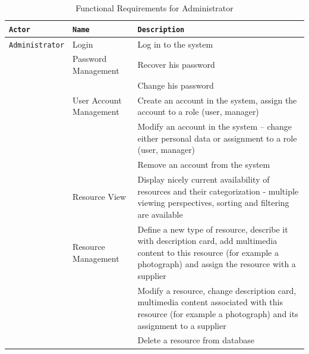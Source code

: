 \documentclass[a4paper,11pt,twoside]{report}
\theoremstyle{definition}
\begin{document}
\begin{longtable}{|p{3cm}|p{3cm}|p{10cm}|}
\caption[Functional Requirements for Administrator]{Functional Requirements for Administrator}
\label{functional requirements administrator}
\tabularnewline

\hline
\texttt{Actor} & \texttt{Name} & \texttt{Description} \\ \hline
\texttt{Administrator} & Login & Log in to the system\\  \cline{2-3}
\texttt{} & Password Management & Recover his password\\  \cline{3-3}
\texttt{} & & Change his password\\ \cline{2-3}

\texttt{} & User Account Management & Create an account in the system, assign the account to a role (user, manager)\\  \cline{3-3}
\texttt{} & & Modify an account in the system – change either personal data or assignment to a role (user, manager)\\ \cline{3-3}
\texttt{} & & Remove an account from the system\\ \cline{2-3}
\texttt{} & Resource View & Display nicely current availability of resources and their categorization - multiple viewing perspectives, sorting and filtering are available\\ \cline{2-3}
\texttt{} & Resource Management & Define a new type of resource, describe it with description card, add multimedia content to this resource (for example a photograph) and assign the resource with a supplier\\ \cline{3-3}
\texttt{} & & Modify a resource, change description card, multimedia content associated with this resource (for example a photograph) and its assignment to a supplier\\ \cline{3-3}
\texttt{} & & Delete a resource from database\\ \cline{2-3}


\end{longtable}
\end{document}
